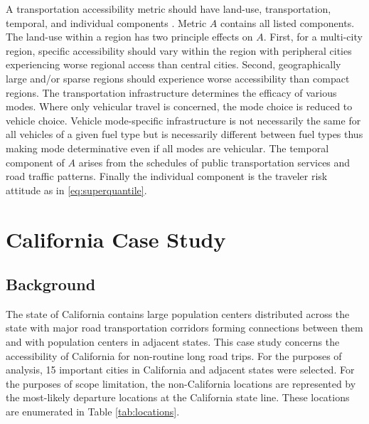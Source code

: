 \documentclass[11pt]{article}
\begin{document}
\begin{multicols}{2}
A transportation accessibility metric should have land-use, transportation, temporal, and individual components \cite{Karst_2003}. Metric $A$ contains all listed components. The land-use within a region has two principle effects on $A$. First, for a multi-city region, specific accessibility should vary within the region with peripheral cities experiencing worse regional access than central cities. Second, geographically large and/or sparse regions should experience worse accessibility than compact regions. The transportation infrastructure determines the efficacy of various modes. Where only vehicular travel is concerned, the mode choice is reduced to vehicle choice. Vehicle mode-specific infrastructure is not necessarily the same for all vehicles of a given fuel type but is necessarily different between fuel types thus making mode determinative even if all modes are vehicular. The temporal component of $A$ arises from the schedules of public transportation services and road traffic patterns. Finally the individual component is the traveler risk attitude as in \eqref{eq:superquantile}.

\section*{California Case Study}

\subsection*{Background}

The state of California contains large population centers distributed across the state with major road transportation corridors forming connections between them and with population centers in adjacent states. This case study concerns the accessibility of California for non-routine long road trips. For the purposes of analysis, 15 important cities in California and adjacent states were selected. For the purposes of scope limitation, the non-California locations are represented by the most-likely departure locations at the California state line. These locations are enumerated in Table \ref{tab:locations}.


\end{multicols}
\end{document}
